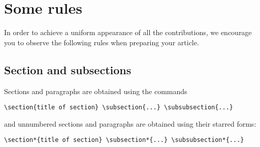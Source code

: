 \documentclass{RSMUP}
\theoremstyle{definition}
\begin{document}
\section{Some rules}

In order to achieve a uniform appearance of all the contributions, we encourage
you to observe the following rules when preparing your article.

\subsection{Section and subsections} Sections and paragraphs are obtained using the commands
\begin{verbatim}\section{title of section} \subsection{...} \subsubsection{...}\end{verbatim}
and unnumbered sections and paragraphs are obtained using their starred forms:
\begin{verbatim}\section*{title of section} \subsection*{...} \subsubsection*{...}\end{verbatim}
\end{document}
